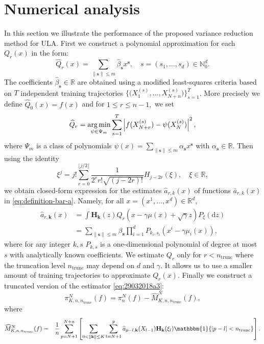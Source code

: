 \documentclass[bj]{imsart}
\def\nset{\mathbb{N}}
\def\rmd{\mathrm{d}}
\newcommand*{\argmin}{\operatornamewithlimits{arg\,min}}
\begin{document}
\section{Numerical analysis}
\label{sec:num}
In this section we illustrate the performance of the proposed variance reduction method for ULA.
First we construct a polynomial approximation  for each \(Q_r(x)\)  in the form:
\begin{equation*}
\widehat{Q}_{r}(x) = \sum_{\|\mathbf{s}\|\leq m} \widehat\beta_{\mathbf{s}} x^{\mathbf{s}},\quad s=(s_1,\ldots,s_d) \in \nset_0^d.
\end{equation*}
The coefficients \(\widehat \beta_{\mathbf{s}}\in \mathbb{R}\) are obtained using a modified least-squares criteria based on $T$ independent training trajectories \(\bigl\{\bigl(X_1^{(s)},\ldots,X_{N+n}^{(s)}\bigr)\bigr\}_{s=1}^{T}\). More precisely  we define $\widehat{Q}_0(x) = f(x)$ and for \(1 \leq r \leq n-1,\) we set
\begin{eqnarray}
\label{eq:Qregr}
\widehat{Q}_r = \argmin_{\psi \in \Psi_m} \sum_{s = 1}^{T}  \left| f(X_{N+r}^{(s)}) - \psi(X_{N}^{(s)})\right|^2,
\end{eqnarray}
 where $\Psi_m$ is a class of polynomials $ \psi(x) = \sum_{\|\mathbf{s}\|\leq m} \alpha_{\mathbf{s}} x^{\mathbf{s}}$ with $\alpha_{\mathbf{s}}\in \mathbb{R}$. Then using the identity
\[
\xi^j = j! \sum_{r = 0}^{\lfloor j/2 \rfloor} \frac{1}{2^r  r! \sqrt{(j-2r)!}} H_{j-2r}(\xi),\quad \xi \in \mathbb{R},
\]
we obtain closed-form expression for the estimates $\widehat a_{r,k}(x)$ of functions $\bar a_{r,k}(x)$ in \eqref{eq:definition-bar-a}. Namely, for all $x=(x^1,\dots,x^d) \in \mathbb{R}^d$,
\begin{align}
\nonumber
\widehat a_{r,\mathbf{k}} (x) &= \int \mathbf{H}_\mathbf{k}(z) \widehat{Q}_{r}(x - \gamma \mu(x) + \sqrt{\gamma}z) P_\xi(\rmd z)
\\
&=
\label{eq:a-pol}
\sum_{\|\mathbf{s}\|\leq m} \beta_{\mathbf{s}} \prod_{i=1}^d P_{k_i,s_i}(x^i - \gamma \mu_i(x)),
\end{align}
where for any integer $k,s$ $P_{k,s}$ is a one-dimensional polynomial of degree at most \(s\) with analytically known coefficients. We estimate $Q_{r}$ only for $r < n_{\mathrm{trunc}}$ where the truncation level \(n_{\mathrm{trunc}}\) may depend on \(d\) and \(\gamma.\) It allows us to use a smaller amount of training trajectories to approximate $Q_{r}(x)$.
Finally  we construct a truncated version of the estimator \eqref{eq:29032018a3}:
\[
\pi_{K,n,n_{\mathrm{trunc}}}^N(f) = \pi_n^N(f) -  \widehat M_{K,n, n_{\mathrm{trunc}}}^{N}(f),
\]
where
\begin{eqnarray*}
\widehat M_{K,n,n_{\mathrm{trunc}}}^N(f) &=&\frac{1}{n}\sum_{p=N+1}^{N+n}\left[\sum_{0 < \|\mathbf{k}\|\leq K}\sum_{l=N+1}^{p} \widehat a_{p-l,\mathbf{k}}(X_{l-1})\mathbf{H}_\mathbf{k}(\xi_{l})\mathbbm{1}\{ | p-l | < n_{\mathrm{trunc}}\}\right].
\end{eqnarray*}
\end{document}
